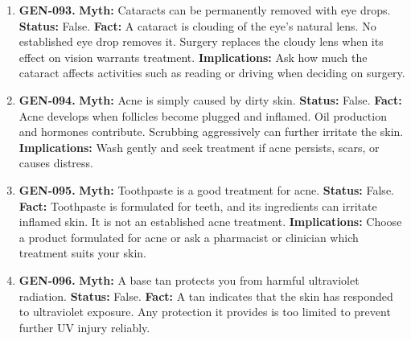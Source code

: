 \documentclass[11pt,oneside]{book}
\begin{document}
\begin{enumerate}[leftmargin=0pt,labelwidth=0pt,labelsep=0pt,itemindent=0pt]
\textbf{Status:} False.\newline
\textbf{Fact:} Ordinary prescription glasses correct how light focuses while they are worn. A prescription may change as the eyes grow or age. \cite{ref306}\newline
\textbf{Implications:} Use the prescribed correction and arrange a review if vision remains blurred while wearing it.
\item[] \textbf{GEN-093.} \textbf{Myth:} Cataracts can be permanently removed with eye drops.\newline
\textbf{Status:} False.\newline
\textbf{Fact:} A cataract is clouding of the eye's natural lens. No established eye drop removes it. Surgery replaces the cloudy lens when its effect on vision warrants treatment. \cite{ref175}\newline
\textbf{Implications:} Ask how much the cataract affects activities such as reading or driving when deciding on surgery.
\item[] \textbf{GEN-094.} \textbf{Myth:} Acne is simply caused by dirty skin.\newline
\textbf{Status:} False.\newline
\textbf{Fact:} Acne develops when follicles become plugged and inflamed. Oil production and hormones contribute. Scrubbing aggressively can further irritate the skin. \cite{ref313}\newline
\textbf{Implications:} Wash gently and seek treatment if acne persists, scars, or causes distress.
\item[] \textbf{GEN-095.} \textbf{Myth:} Toothpaste is a good treatment for acne.\newline
\textbf{Status:} False.\newline
\textbf{Fact:} Toothpaste is formulated for teeth, and its ingredients can irritate inflamed skin. It is not an established acne treatment. \cite{ref313}\newline
\textbf{Implications:} Choose a product formulated for acne or ask a pharmacist or clinician which treatment suits your skin.
\item[] \textbf{GEN-096.} \textbf{Myth:} A base tan protects you from harmful ultraviolet radiation.\newline
\textbf{Status:} False.\newline
\textbf{Fact:} A tan indicates that the skin has responded to ultraviolet exposure. Any protection it provides is too limited to prevent further UV injury reliably. \cite{ref319}\newline

\end{enumerate}
\end{document}
